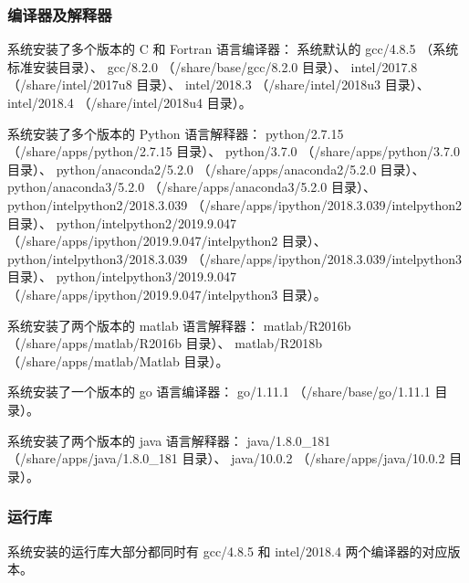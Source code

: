 \documentclass[UTF8]{ctexart}
\begin{document}
\subsubsection{编译器及解释器}
系统安装了多个版本的 C 和 Fortran 语言编译器：\newline
系统默认的 gcc/4.8.5 （系统标准安装目录）、\newline
gcc/8.2.0 （/share/base/gcc/8.2.0 目录）、\newline
intel/2017.8 （/share/intel/2017u8 目录）、\newline
intel/2018.3 （/share/intel/2018u3 目录）、\newline
intel/2018.4 （/share/intel/2018u4 目录）。
\bigskip

系统安装了多个版本的 Python 语言解释器：\newline
python/2.7.15 （/share/apps/python/2.7.15 目录）、\newline
python/3.7.0 （/share/apps/python/3.7.0 目录）、\newline
python/anaconda2/5.2.0 （/share/apps/anaconda2/5.2.0 目录）、\newline
python/anaconda3/5.2.0 （/share/apps/anaconda3/5.2.0 目录）、\newline
python/intelpython2/2018.3.039 （/share/apps/ipython/2018.3.039/intelpython2 目录）、\newline
python/intelpython2/2019.9.047 （/share/apps/ipython/2019.9.047/intelpython2 目录）、\newline
python/intelpython3/2018.3.039 （/share/apps/ipython/2018.3.039/intelpython3 目录）、\newline
python/intelpython3/2019.9.047 （/share/apps/ipython/2019.9.047/intelpython3 目录）。
\bigskip

系统安装了两个版本的 matlab 语言解释器：\newline
matlab/R2016b （/share/apps/matlab/R2016b 目录）、\newline
matlab/R2018b （/share/apps/matlab/Matlab 目录）。
\bigskip

系统安装了一个版本的 go 语言编译器：\newline
go/1.11.1 （/share/base/go/1.11.1 目录）。
\bigskip

系统安装了两个版本的 java 语言解释器：\newline
java/1.8.0\_181 （/share/apps/java/1.8.0\_181 目录）、\newline
java/10.0.2 （/share/apps/java/10.0.2 目录）。

\subsubsection{运行库}
系统安装的运行库大部分都同时有 gcc/4.8.5 和 intel/2018.4 两个编译器的对应版本。
\bigskip
\end{document}

